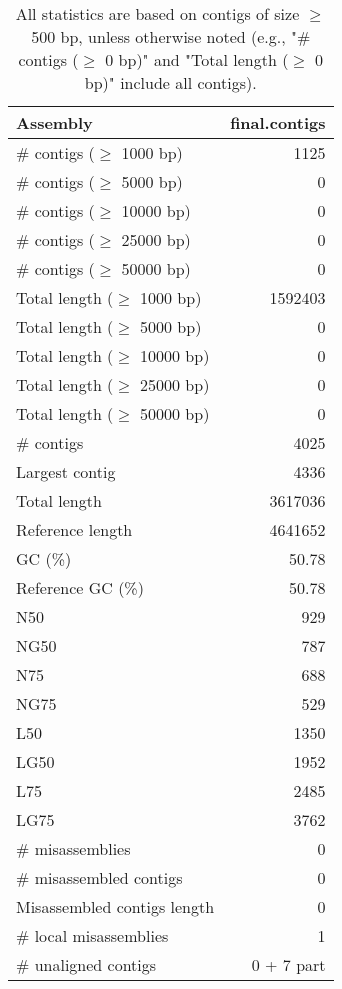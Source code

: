 \documentclass[12pt,a4paper]{article}
\begin{document}
\begin{table}[ht]
\begin{center}
\caption{All statistics are based on contigs of size $\geq$ 500 bp, unless otherwise noted (e.g., "\# contigs ($\geq$ 0 bp)" and "Total length ($\geq$ 0 bp)" include all contigs).}
\begin{tabular}{|l*{1}{|r}|}
\hline
Assembly & final.contigs \\ \hline
\# contigs ($\geq$ 1000 bp) & 1125 \\ \hline
\# contigs ($\geq$ 5000 bp) & 0 \\ \hline
\# contigs ($\geq$ 10000 bp) & 0 \\ \hline
\# contigs ($\geq$ 25000 bp) & 0 \\ \hline
\# contigs ($\geq$ 50000 bp) & 0 \\ \hline
Total length ($\geq$ 1000 bp) & 1592403 \\ \hline
Total length ($\geq$ 5000 bp) & 0 \\ \hline
Total length ($\geq$ 10000 bp) & 0 \\ \hline
Total length ($\geq$ 25000 bp) & 0 \\ \hline
Total length ($\geq$ 50000 bp) & 0 \\ \hline
\# contigs & 4025 \\ \hline
Largest contig & 4336 \\ \hline
Total length & 3617036 \\ \hline
Reference length & 4641652 \\ \hline
GC (\%) & 50.78 \\ \hline
Reference GC (\%) & 50.78 \\ \hline
N50 & 929 \\ \hline
NG50 & 787 \\ \hline
N75 & 688 \\ \hline
NG75 & 529 \\ \hline
L50 & 1350 \\ \hline
LG50 & 1952 \\ \hline
L75 & 2485 \\ \hline
LG75 & 3762 \\ \hline
\# misassemblies & 0 \\ \hline
\# misassembled contigs & 0 \\ \hline
Misassembled contigs length & 0 \\ \hline
\# local misassemblies & 1 \\ \hline
\# unaligned contigs & 0 + 7 part \\ \hline

\end{tabular}
\end{center}
\end{table}
\end{document}
